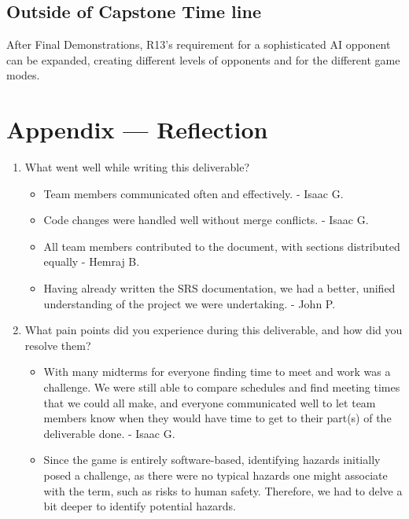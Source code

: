 \documentclass{article}
\begin{document}
\subsection{Outside of Capstone Time line}
	After Final Demonstrations, R13's requirement for a sophisticated AI opponent can be expanded, creating different levels of opponents and for the different game modes.

\newpage{}

\section*{Appendix --- Reflection}


%

\begin{enumerate}
    \item What went well while writing this deliverable?

    \begin{itemize}
        \item Team members communicated often and effectively. - Isaac G.
        \item Code changes were handled well without merge conflicts. - Isaac G.
        \item All team members contributed to the document, with sections distributed equally - Hemraj B.
        \item Having already written the SRS documentation, we had a better, unified understanding of the project we were undertaking. - John P.
	\end{itemize}

    \item What pain points did you experience during this deliverable, and how
    did you resolve them?

    \begin{itemize}
        \item With many midterms for everyone finding time to meet and work was a challenge. We were still able to compare schedules and find meeting times that we could all make, and everyone communicated well to let team members know when they would have time to get to their part(s) of the deliverable done. - Isaac G.
        \item Since the game is entirely software-based, identifying hazards initially posed a challenge, as there were no typical hazards one might associate with the term, such as risks to human safety. Therefore, we had to delve a bit deeper to identify potential hazards.
	\end{itemize}


\end{enumerate}
\end{document}
